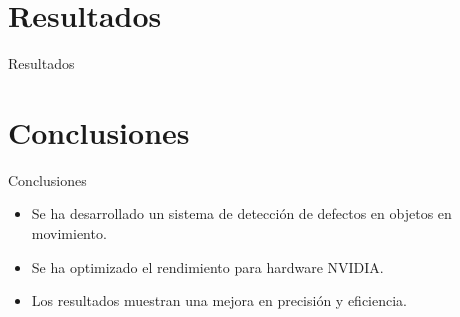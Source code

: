 \documentclass[spanish]{beamer}
\begin{document}
\section{Resultados}
\begin{frame}{Resultados}
\end{frame}

\section{Conclusiones}
\begin{frame}{Conclusiones}
    \begin{itemize}
        \item Se ha desarrollado un sistema de detección de defectos en objetos en movimiento.
        \item Se ha optimizado el rendimiento para hardware NVIDIA.
        \item Los resultados muestran una mejora en precisión y eficiencia.
    \end{itemize}
\end{frame}
\end{document}
